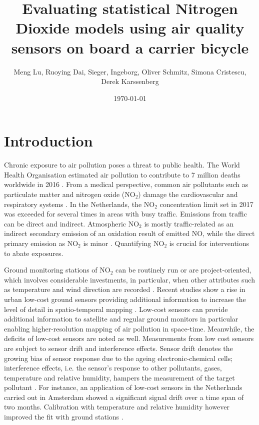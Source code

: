 \documentclass{article}
\title{Evaluating statistical Nitrogen Dioxide models using air quality sensors on board a carrier bicycle}
\author{Meng Lu,  Ruoying Dai, Sieger,  Ingeborg, Oliver Schmitz, Simona Cristescu, Derek Karssenberg }
\date{\today}
\begin{document}
\maketitle

\section{Introduction}
Chronic exposure to air pollution poses a threat to public health. The World Health Organisation estimated air pollution to contribute to 7 million deaths worldwide in 2016 \citep{world2018burden}. From a medical perspective, common air pollutants such as particulate matter and nitrogen oxide (NO$_2$) damage the cardiovascular and respiratory systems \citep{anderson2012clearing, pascal2009effets}.  In the Netherlands, the NO$_2$ concentration limit set in 2017 was exceeded for several times in areas with busy traffic\citep{no2}. Emissions from traffic can be direct and indirect. Atmospheric NO$_2$ is mostly traffic-related as an indirect secondary emission of an oxidation result of emitted NO, while the direct primary emission as NO$_2$ is minor \citep{ukno2,no2}. Quantifying NO$_2$ is crucial for interventions to abate exposures.

 Ground monitoring stations of NO$_2$ can be routinely run or are project-oriented, which involves considerable investments, in particular, when other attributes such as temperature and wind direction are recorded \citep{hoek2008review}. Recent studies show a rise in urban low-cost ground sensors providing additional information to increase the level of detail in spatio-temporal mapping \citep{spinelle2015field, schneider2017mapping,isiugo2018assessing}. Low-cost sensors can provide additional information to satellite and regular ground monitors in particular enabling higher-resolution mapping of air pollution in space-time. Meanwhile, the deficits of low-cost sensors are noted as well. Measurements from low cost sensors are subject to sensor drift and interference effects. Sensor drift denotes the growing bias of sensor response due to the ageing electronic-chemical cells; interference effects, i.e. the sensor's response to other pollutants, gases, temperature and relative humidity, hampers the measurement of the target pollutant \citep{van2019calibration}. For instance, an application of low-cost sensors in the Netherlands carried out in Amsterdam showed a significant signal drift over a time span of two months. Calibration with temperature and relative humidity however improved the fit with ground stations \citep{mijling2018field}. 
 
\end{document}
